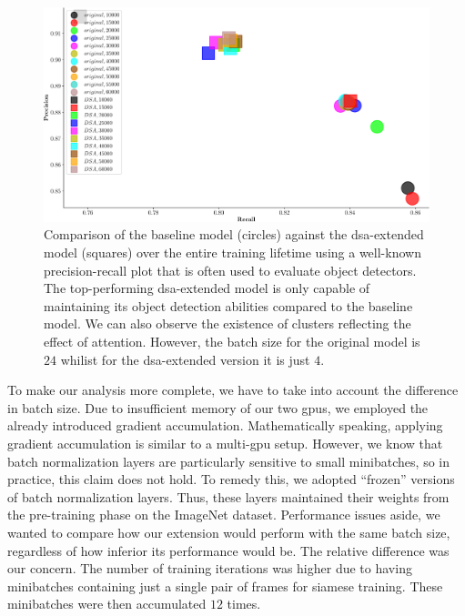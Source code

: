 \begin{figure}[t]
    \centerline{\includegraphics[width=\linewidth]{figures/siamese_tracking/tracker_cmp_160_2x12_vs_160_2x2_DSA_rec_prec.pdf}}
    \caption[\gls{dsa} evaluation - secondary metrics]{Comparison of the baseline model (circles) against the \gls{dsa}-extended model (squares) over the entire training lifetime using a well-known precision-recall plot that is often used to evaluate object detectors. The top-performing \gls{dsa}-extended model is only capable of maintaining its object detection abilities compared to the baseline model. We can also observe the existence of clusters reflecting the effect of attention. However, the batch size for the original model is $24$ whilist for the \gls{dsa}-extended version it is just $4$.}
    \label{fig:OrigVsDSA_160RPN_Prec_Rec}
\end{figure}

To make our analysis more complete, we have to take into account the difference in batch size. Due to insufficient memory of our two \glspl{gpu}, we employed the already introduced gradient accumulation. Mathematically speaking, applying gradient accumulation is similar to a multi-\gls{gpu} setup. However, we know that batch normalization layers are particularly sensitive to small minibatches, so in practice, this claim does not hold. To remedy this, we adopted ``frozen'' versions of batch normalization layers. Thus, these layers maintained their weights from the pre-training phase on the ImageNet dataset. Performance issues aside, we wanted to compare how our extension would perform with the same batch size, regardless of how inferior its performance would be. The relative difference was our concern. The number of training iterations was higher due to having minibatches containing just a single pair of frames for siamese training. These minibatches were then accumulated $12$ times.

